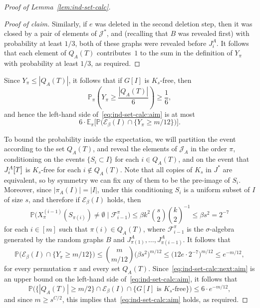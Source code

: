 \documentclass[10pt,a4paper]{amsart}
\newcommand\pig[1]{\scalerel*[5pt]{\normalsize#1}{%
  \ensurestackMath{\addstackgap[0.5pt]{\normalsize#1}}}}
\numberwithin{theorem}{section}
\renewcommand{\(}{\bigl(}
\renewcommand{\)}{\bigr)\vphantom{)}}
\newcommand{\cF}{\mathcal F}
\newcommand{\cE}{\mathcal E}
\newcommand{\cJ}{\mathcal J}
\renewcommand{\le}{\leqslant}
\renewcommand{\ge}{\geqslant}
\newcommand{\Ex}{\mathbb E}
\renewcommand{\Pr}{\mathbb{P}}
\begin{document}
\begin{proof}[Proof of Lemma~\ref{lem:ind-set-calc}]
\begin{proof}[Proof of claim]
Similarly, if $e$ was deleted in the second deletion step, then it was closed by a pair of elements of $\cJ^*$, and (recalling that $B$ was revealed first) with probability at least $1/3$, both of these graphs were revealed before $J^A_i$. It follows that each element of $Q_A(T)$ contributes~$1$ to the sum in the definition of $Y_\pi$ with probability at least $1/3$, as required.
\end{proof}

Since $Y_\pi \le |Q_A(T)|$, it follows that if $G[I]$ is $K_s$-free, then
$$\Pr_\pi\left( Y_\pi \ge \frac{|Q_A(T)|}{6} \right) \ge \frac{1}{6},$$
and hence the left-hand side of~\eqref{eq:ind-set-calc:aim} is at most
\begin{equation}\label{eq:ind-set-calc:next:aim}
6 \cdot \Ex_\pi\Big[ \Pr\Big( \cE_\beta(I) \cap \big\{ Y_\pi \ge m/12 \big\} \Big) \Big].
\end{equation}

To bound the probability inside the expectation, we will partition the event according to the set $Q_A(T)$, and reveal the elements of $\cJ_A$ in the order $\pi$, conditioning on the events $\{ S_i \subset I \}$ for each $i \in Q_A(T)$, and on the event that $J_i^A\pig[ T \pig]$ is $K_s$-free for each $i \not\in Q_A(T)$. Note that all copies of $K_s$ in $J^*$ are equivalent, so by symmetry we can fix any of them to be the pre-image of $S_i$. Moreover, since $|\pi_A(I)| = |I|$, under this conditioning $S_i$ is a uniform subset of $I$ of size $s$, and therefore if $\cE_\beta(I)$ holds, then 
\begin{equation}\label{eq:supersaturation}
\Pr\Big( X_\pi^{(i-1)}(S_{\pi(i)}) \ne \emptyset \;\big|\; \cF_{i-1}^\pi \Big) \le \beta k^2 {s \choose 2} {k \choose 2}^{-1} \le \beta s^2 = 2^{-7}
\end{equation}
for each $i \in [m]$ such that $\pi(i) \in Q_A(T)$, where $\cF_{i-1}^\pi$ is the $\sigma$-algebra generated by the random graphs $B$ and $J^A_{\pi(1)},\ldots,J^A_{\pi(i-1)}$. It follows that
$$\Pr\Big( \cE_\beta(I) \cap \big\{ Y_\pi \ge m/12 \big\} \Big) \le {m \choose m/12} \big( \beta s^2 \big)^{m/12} \le \big( 12e \cdot 2^{-7} \big)^{m/12} \le e^{-m/12},$$
for every permutation $\pi$ and every set $Q_A(T)$. Since~\eqref{eq:ind-set-calc:next:aim} is an upper bound on the left-hand side of~\eqref{eq:ind-set-calc:aim}, it follows that
$$\Pr\Big( \big\{ |Q_A(T)| \ge m/2 \big\} \cap \cE_\beta(I) \cap \big\{ G[I] \text{ is $K_s$-free} \big\} \Big) \le 6 \cdot e^{-m/12},$$
and since $m \ge s^{C/2}$, this implies that~\eqref{eq:ind-set-calc:aim} holds, as required. 
\end{proof}
\end{document}
